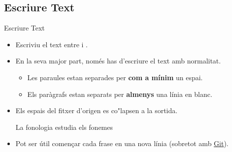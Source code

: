 \subsection{Escriure Text}
\begin{frame}[fragile]{Escriure Text}
\small
\begin{itemize}
\item Escriviu el text entre  i .
\item En la seva major part, només has d'escriure el text amb normalitat.

\begin{itemize}
    \item Les paraules estan separades per \textbf{com a mínim} un espai.
    \item Els paràgrafs estan separats per \textbf{almenys} una línia en blanc.
\end{itemize}

\item Els espais del fitxer d'origen es co"lapsen a la sortida. 
\begin{exampletwouptiny}
La          fonologia
    estudia els fonemes 
\end{exampletwouptiny}
\item Pot ser útil començar cada frase en una nova línia (sobretot amb \href{https://git-scm.com/}{Git}).
\end{itemize}
\end{frame}

